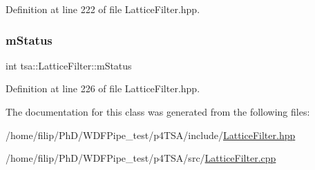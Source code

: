 Definition at line 222 of file Lattice\+Filter.\+hpp.

\mbox{\label{classtsa_1_1_lattice_filter_ab480cbe362a358df626bcd0758c0a7ce}} 
\subsubsection{\texorpdfstring{m\+Status}{mStatus}}
{\footnotesize\ttfamily int tsa\+::\+Lattice\+Filter\+::m\+Status\hspace{0.3cm}{\ttfamily [private]}}



Definition at line 226 of file Lattice\+Filter.\+hpp.



The documentation for this class was generated from the following files\+:\begin{DoxyCompactItemize}
\item 
/home/filip/\+Ph\+D/\+W\+D\+F\+Pipe\+\_\+test/p4\+T\+S\+A/include/\hyperlink{_lattice_filter_8hpp}{Lattice\+Filter.\+hpp}\item 
/home/filip/\+Ph\+D/\+W\+D\+F\+Pipe\+\_\+test/p4\+T\+S\+A/src/\hyperlink{_lattice_filter_8cpp}{Lattice\+Filter.\+cpp}\end{DoxyCompactItemize}

